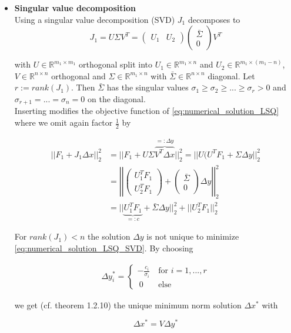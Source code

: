 \documentclass{scrartcl}[12pt, halfparskip]
\numberwithin{equation}{section}
\numberwithin{figure}{section}
\numberwithin{table}{section}
\begin{document}
\begin{itemize}
		
		
	\item \textbf{Singular value decomposition} \\
	Using a singular value decomposition (SVD) $J_1$ decomposes to
	\begin{equation}
		J_1 = U \Sigma V^T =
		\begin{pmatrix}
			U_1 & U_2
		\end{pmatrix}
		\begin{pmatrix}
			\bar{\Sigma} \\
			0
		\end{pmatrix}
			V^T
	\end{equation}
	
	with $U \in \mathbb{R}^{m_1 \times m_1}$ orthogonal split into $U_1 \in \mathbb{R}^{m_1 \times n}$ and $U_2 \in \mathbb{R}^{m_1 \times (m_1 - n)}$, $V \in \mathbb{R}^{n \times n}$ orthogonal and $\Sigma \in \mathbb{R}^{m_1 \times n}$ with $\bar{\Sigma} \in \mathbb{R}^{n \times n}$ diagonal. Let $r := rank(J_1)$. Then $\bar{\Sigma}$ has the singular values $\sigma_1 \ge \sigma_2 \ge ... \ge \sigma_r > 0$ and $\sigma_{r+1}=...=\sigma_{n} = 0$ on the diagonal. \\
	Inserting modifies the objective function of \cref{eq:numerical_solution_LSQ} where we omit again factor $\frac{1}{2}$ by
	
	\begin{align}
		|| F_1 + J_1 \Delta x ||_2^2 & = || F_1 + U \Sigma \overbrace{V^T \Delta x}^{=: \Delta y} ||_2^2 = || U ( U^T F_1 + \Sigma \Delta y ||_2^2 \label{eq:numerical_solution_LSQ_SVD} \\
		& = \left| \left| \begin{pmatrix}
		U_1^T F_1 \\
		U_2^T F_1
		\end{pmatrix} + 
		\begin{pmatrix}
		\bar{\Sigma} \\
		0
		\end{pmatrix}
		\Delta y \right| \right|_2^2 \nonumber \\
		& = || \underbrace{U_1^T F_1}_{=: c} + \bar{\Sigma} \Delta y ||_2^2 + || U_2^T F_1 ||_2^2 \nonumber
	\end{align}
	
	For $rank(J_1) < n$ the solution $\Delta y$ is not unique to minimize \cref{eq:numerical_solution_LSQ_SVD}. By choosing
	
	\begin{align}
		\Delta y_i^* = 
		\begin{cases}
			- \frac{c_i}{\sigma_i} \ & \text{for } i=1,...,r \\
			\ 0 \ & \text{else}
		\end{cases}
	\end{align}
	
	we get (cf. \cite{numerical_methods_lsq_Bjorck} theorem 1.2.10) the unique minimum norm solution  $\Delta x^*$ with
	
	\begin{equation}
		\Delta x^* = V \Delta y^*
	\end{equation}

\end{itemize}
\end{document}
